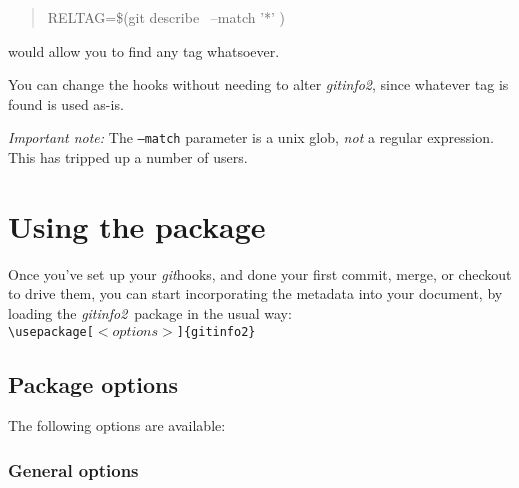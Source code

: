 \documentclass[a4paper,12pt,twoside,openany]{memoir}
\newcommand{\sfit}[1]{\textit{#1}}
\newcommand{\git}{\sfit{git}}
\newcommand{\tpname}{\sfit{gitinfo2}}
\begin{document}
\begin{quotation}
{\ttfamily
RELTAG=\$(git describe \textellipsis\ --match '*' \textellipsis)
}
\end{quotation}
would allow you to find any tag whatsoever.

You can change the hooks without needing to alter \tpname,
since whatever tag is found is used as-is.

\emph{Important note:} The \texttt{--match} parameter is a unix glob, 
\emph{not} a regular expression. This has tripped up a number of users.

\chapter{Using the package}
\label{ch:using}
Once you've set up your \git hooks, and done your first commit,
merge, or checkout to drive them,
you can start incorporating the metadata into your document,
by loading the \tpname\ package in the usual way:\\[0.5\baselineskip]
\texttt{\textbackslash usepackage[$<options>$]\{gitinfo2\}}

\section{Package options}

The following options are available:

\subsection{General options}
\end{document}
